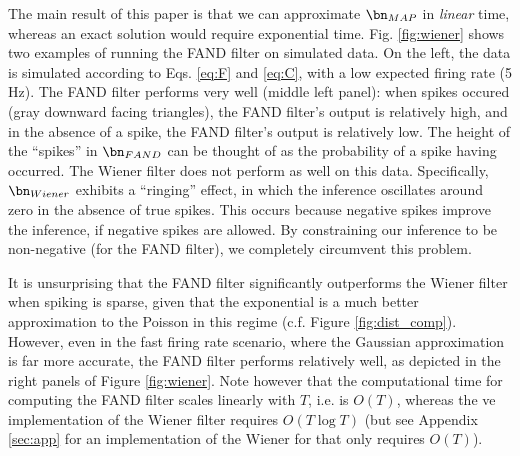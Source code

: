 The main result of this paper is that we can approximate $\bn_{MAP}$ in \emph{linear} time, whereas an exact solution would require exponential time. Fig. \ref{fig:wiener} shows two examples of running the FAND filter on simulated data.  On the left, the data is simulated according to Eqs. \eqref{eq:F} and \eqref{eq:C}, with a low expected firing rate (5 Hz).  The FAND filter performs very well (middle left panel): when spikes occured (gray downward facing triangles), the FAND filter's output is relatively high, and in the absence of a spike, the FAND filter's output is relatively low. The height of the ``spikes'' in $\bn_{FAND}$ can be thought of as the probability of a spike having occurred.  The Wiener filter does not perform as well on this data.  Specifically, $\bn_{Wiener}$ exhibits a ``ringing'' effect, in which the inference oscillates around zero in the absence of true spikes.  This occurs because negative spikes improve the inference, if negative spikes are allowed.  By constraining our inference to be non-negative (for the FAND filter), we completely circumvent this problem.  

It is unsurprising that the FAND filter significantly outperforms the Wiener filter when spiking is sparse, given that the exponential is a much better approximation to the Poisson in this regime (c.f. Figure \ref{fig:dist_comp}).  However, even in the fast firing rate scenario, where the Gaussian approximation is far more accurate, the FAND filter performs relatively well, as depicted in the right panels of Figure \ref{fig:wiener}.  Note however that the computational time for computing the FAND filter scales linearly with $T$, i.e. is $O(T)$, whereas the \nai ve implementation of the Wiener filter requires $O(T \log T)$ (but see Appendix \ref{sec:app} for an implementation of the Wiener for that only requires $O(T)$).  

